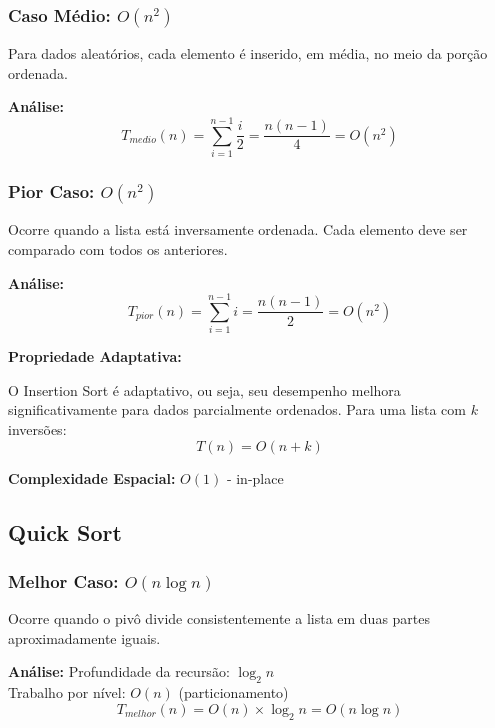 \documentclass[conference]{IEEEtran}
\begin{document}
\subsubsection{Caso Médio: $O(n^2)$}

Para dados aleatórios, cada elemento é inserido, em média, no meio da porção ordenada.

\textbf{Análise:}
\begin{equation}
T_{medio}(n) = \sum_{i=1}^{n-1} \frac{i}{2} = \frac{n(n-1)}{4} = O(n^2)
\end{equation}

\subsubsection{Pior Caso: $O(n^2)$}

Ocorre quando a lista está inversamente ordenada. Cada elemento deve ser comparado com todos os anteriores.

\textbf{Análise:}
\begin{equation}
T_{pior}(n) = \sum_{i=1}^{n-1} i = \frac{n(n-1)}{2} = O(n^2)
\end{equation}

\textbf{Propriedade Adaptativa:}

O Insertion Sort é adaptativo, ou seja, seu desempenho melhora significativamente para dados parcialmente ordenados. Para uma lista com $k$ inversões:
\begin{equation}
T(n) = O(n + k)
\end{equation}

\textbf{Complexidade Espacial:} $O(1)$ - in-place

\subsection{Quick Sort}

\subsubsection{Melhor Caso: $O(n \log n)$}

Ocorre quando o pivô divide consistentemente a lista em duas partes aproximadamente iguais.

\textbf{Análise:}
Profundidade da recursão: $\log_2 n$\\
Trabalho por nível: $O(n)$ (particionamento)
\begin{equation}
T_{melhor}(n) = O(n) \times \log_2 n = O(n \log n)
\end{equation}
\end{document}
